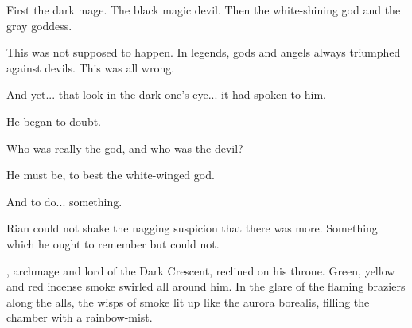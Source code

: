 First the dark mage. The black magic devil. Then the white-shining god and the gray goddess. 


This was not supposed to happen. In legends, gods and angels always triumphed against devils. This was all wrong. 

And yet... that look in the dark one's eye... it had spoken to him. 

He began to doubt. 

Who was really the god, and who was the devil? 

He must be, to best the white-winged god. 

And to do... something. 

Rian could not shake the 
nagging suspicion that there was more. Something which he ought to remember but could not. 










\begin{comment}
\subsection{\Nithdornazsh}
\end{comment}


\LocarPsyrex{}, archmage and lord of the Dark Crescent, reclined on his throne. 
Green, yellow and red incense smoke swirled all around him. 
In the glare of the flaming braziers along the alls, the wisps of smoke lit up like the aurora borealis, filling the chamber with a rainbow-\coloured mist. 

